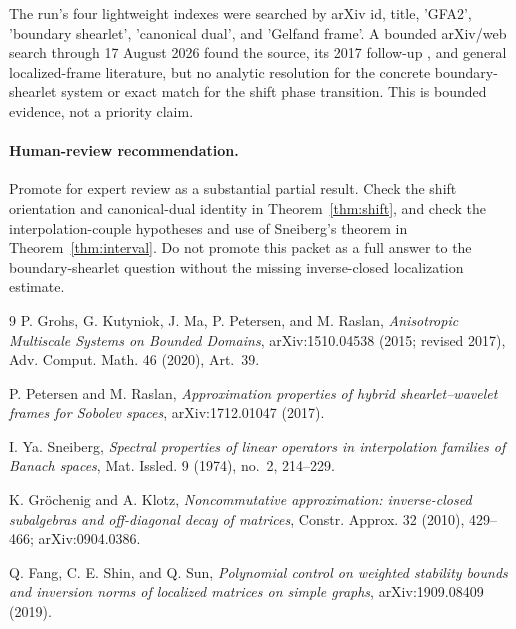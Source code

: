 \documentclass[11pt]{article}
\begin{document}
The run's four lightweight indexes were searched by arXiv id, title,
'GFA2', 'boundary shearlet', 'canonical dual', and 'Gelfand frame'.
A bounded arXiv/web search through 17 August 2026 found the source, its 2017
follow-up \cite{PR17}, and general localized-frame literature, but no analytic
resolution for the concrete boundary-shearlet system or exact match for the
shift phase transition. This is bounded evidence, not a priority claim.

\paragraph{Human-review recommendation.}
Promote for expert review as a substantial partial result. Check the shift
orientation and canonical-dual identity in Theorem~\ref{thm:shift}, and check
the interpolation-couple hypotheses and use of Sneiberg's theorem in
Theorem~\ref{thm:interval}. Do not promote this packet as a full answer to
the boundary-shearlet question without the missing inverse-closed localization
estimate.

\begin{thebibliography}{9}
\small
{}
P. Grohs, G. Kutyniok, J. Ma, P. Petersen, and M. Raslan,
\emph{Anisotropic Multiscale Systems on Bounded Domains},
arXiv:1510.04538 (2015; revised 2017), Adv. Comput. Math. 46 (2020), Art.~39.

P. Petersen and M. Raslan,
\emph{Approximation properties of hybrid shearlet--wavelet frames for Sobolev
spaces}, arXiv:1712.01047 (2017).

I. Ya. Sneiberg,
\emph{Spectral properties of linear operators in interpolation families of
Banach spaces}, Mat. Issled. 9 (1974), no.~2, 214--229.

K. Gr\"ochenig and A. Klotz,
\emph{Noncommutative approximation: inverse-closed subalgebras and
off-diagonal decay of matrices}, Constr. Approx. 32 (2010), 429--466;
arXiv:0904.0386.

Q. Fang, C. E. Shin, and Q. Sun,
\emph{Polynomial control on weighted stability bounds and inversion norms of
localized matrices on simple graphs}, arXiv:1909.08409 (2019).
\end{thebibliography}
\end{document}
